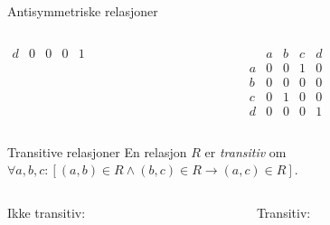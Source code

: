 \begin{frame}[fragile]{Antisymmetriske relasjoner}
\begin{columns}
\begin{column}{0.3\textwidth}
\begin{math}
\begin{matrix}
                    d & 0 & 0 & 0 & 1
                \end{matrix}
            \end{math}
        \end{column}
        \begin{column}{0.3\textwidth}
            \begin{math}
                \begin{matrix}
                      & a & b & c & d\\
                    a & 0 & 0 & 1 & 0\\
                    b & 0 & 0 & 0 & 0\\
                    c & 0 & 1 & 0 & 0\\
                    d & 0 & 0 & 0 & 1
                \end{matrix}
            \end{math}
        \end{column}
    \end{columns}
\end{frame}

\begin{frame}[fragile]{Transitive relasjoner}
    En relasjon $R$ er \emph{transitiv} om $\forall a, b, c : [(a, b) \in R \land (b, c) \in R \rightarrow (a, c) \in R]$.\\
    \begin{columns}
        \begin{column}{0.3\textwidth}
            Ikke transitiv:
        \end{column}
        \pause
        \begin{column}{0.3\textwidth}
            Transitiv:
        \end{column}
    \end{columns}
\end{frame}